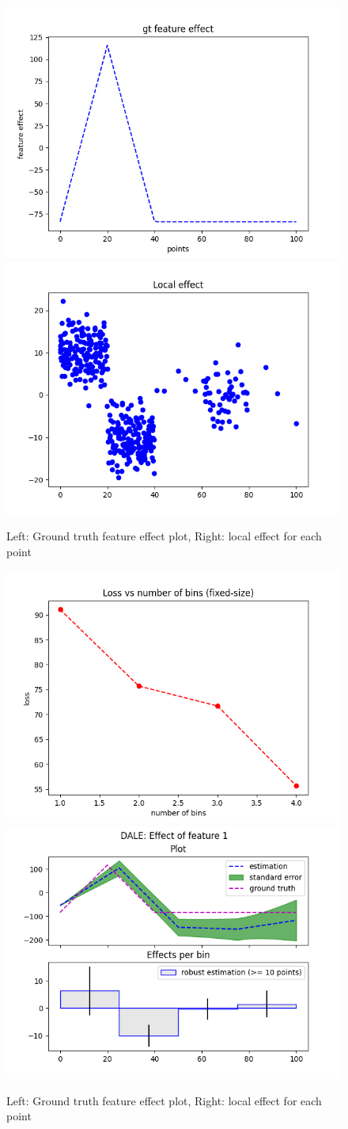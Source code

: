 \documentclass{article}
\begin{document}
\begin{figure}[!h]
  \centering
  \includegraphics[width=.49\linewidth]{bullet_3/im_1.png}
  \includegraphics[width=.49\linewidth]{bullet_3/im_2.png}\\
  \caption{Left: Ground truth feature effect plot, Right: local effect
    for each point}
  \label{fig:bullet-3-im-1}
\end{figure}

\begin{figure}[!h]
  \centering
  \includegraphics[width=.49\linewidth]{bullet_3/im_3.png}
  \includegraphics[width=.49\linewidth]{bullet_3/im_4.png}\\
  \caption{Left: Ground truth feature effect plot, Right: local effect for each point}
  \label{fig:bullet-3-im-2}
\end{figure}
\end{document}
